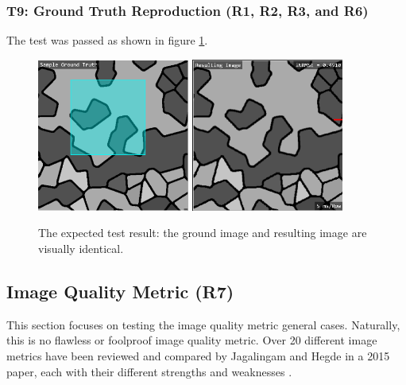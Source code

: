 \documentclass[12pt, titlepage]{article}
\begin{document}
\subsubsection{T9: Ground Truth Reproduction (R1, R2, R3, and R6)}
The test was passed as shown in figure \ref{fig_t9}.
\begin{figure}[h!]
  \begin{center}
   \includegraphics[width=5cm]{t9a.png}
   \includegraphics[width=5cm]{t9b.png}
  \caption{The expected test result: the ground image and resulting image are visually identical.}
  \label{fig_t9} 
  \end{center}
\end{figure}


\subsection{Image Quality Metric (R7)}
This section focuses on testing the image quality metric general cases. Naturally,
this is no flawless or foolproof image quality metric. Over 20 different image metrics have been
reviewed and compared by Jagalingam and Hegde in a 2015 paper,
each with their different strengths and weaknesses \cite{JAGALINGAM2015133}.
\end{document}
